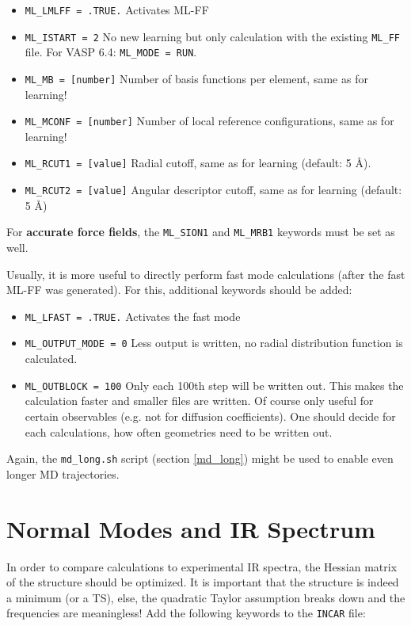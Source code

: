 \documentclass[a4paper,11pt]{article}
\begin{document}
\begin{itemize}
 \item \texttt{ML\_LMLFF = .TRUE.} Activates ML-FF
 \item \texttt{ML\_ISTART = 2} No new learning but only calculation with the existing \texttt{ML\_FF} file. 
     For VASP 6.4: \texttt{ML\_MODE = RUN}.
 \item \texttt{ML\_MB = [number]} Number of basis functions per element, same as for learning!
 \item \texttt{ML\_MCONF = [number]} Number of local reference configurations, same as for learning!
 \item \texttt{ML\_RCUT1 = [value]} Radial cutoff, same as for learning (default: 5 \AA).
 \item \texttt{ML\_RCUT2 = [value]} Angular descriptor cutoff, same as for learning (default: 5 \AA)
\end{itemize}

For \textbf{accurate force fields}, the \texttt{ML\_SION1} and \texttt{ML\_MRB1} keywords must be set as well.

Usually, it is more useful to directly perform fast mode calculations (after the fast ML-FF was generated).
For this, additional keywords should be added:

\begin{itemize}
 \item \texttt{ML\_LFAST = .TRUE.} Activates the fast mode
 \item \texttt{ML\_OUTPUT\_MODE = 0} Less output is written, no radial distribution function is calculated.
 \item \texttt{ML\_OUTBLOCK = 100} Only each 100th step will be written out. This makes the calculation faster
 and smaller files are written. Of course only useful for certain observables (e.g. not for diffusion coefficients). One should decide for each calculations, how often geometries need to be written out.
\end{itemize}

Again, the \texttt{md\_long.sh} script (section \ref{md_long}) might be used to enable even longer MD trajectories.


\section{Normal Modes and IR Spectrum}

In order to compare calculations to experimental IR spectra, the Hessian matrix of the structure 
should be optimized. It is important that the structure is indeed a minimum (or a TS), else,
the quadratic Taylor assumption breaks down and the frequencies are meaningless!
Add the following keywords to the \texttt{INCAR} file:
\end{document}
